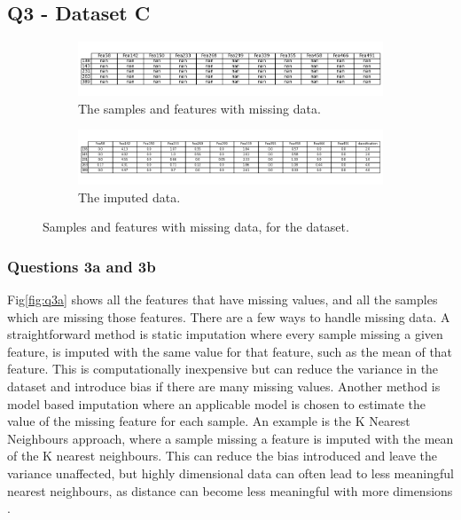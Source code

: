 
\subsection{Q3 - Dataset C}\label{subsec:dataset-c}
    \begin{figure}
    \centering
    \begin{subfigure}{0.9\textwidth}
        \centering
        \includegraphics[width=1\textwidth]{./figures/q3a}
        \caption{The samples and features with missing data.}
        \label{fig:q3a}
    \end{subfigure}%
    \hfill
    \begin{subfigure}{0.9\textwidth}
        \centering
        \includegraphics[width=1\textwidth]{./figures/q3c_1}
        \caption{The imputed data.}
        \label{fig:q3c}
    \end{subfigure}
    \caption{Samples and features with missing data, for the  dataset.}
    \label{fig:q3ac}
    \end{figure}

\subsubsection{Questions 3a and 3b}\label{subsubsec:q3ab}
    Fig\eqref{fig:q3a} shows all the features that have missing values, and all the samples which are missing
    those features.
    There are a few ways to handle missing data.
    A straightforward method is static imputation where every sample missing a given feature, is imputed with the same
    value for that feature, such as the mean of that feature.
    This is computationally inexpensive but can reduce the variance in the dataset and introduce bias if there are many
    missing values.
    Another method is model based imputation where an applicable model is chosen to estimate the value of the missing
    feature for each sample.
    An example is the K Nearest Neighbours approach, where a sample missing a feature is imputed with the mean of the
    K nearest neighbours.
    This can reduce the bias introduced and leave the variance unaffected, but highly dimensional data can often lead
    to less meaningful nearest neighbours, as distance can become less meaningful with more dimensions \cite{bellman1957}.

